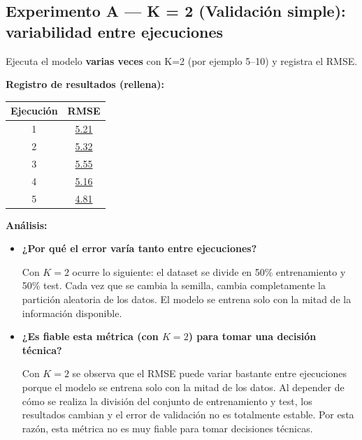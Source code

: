 \documentclass[12pt,oneside]{book}
\begin{document}
\subsection{Experimento A — K = 2 (Validación simple): variabilidad entre ejecuciones}

\noindent Ejecuta el modelo \textbf{varias veces} con K=2 (por ejemplo 5--10) y registra el RMSE.

\begin{center}
\end{center}

\noindent\textbf{Registro de resultados (rellena):}
\begin{center}
\begin{tabular}{|c|c|}
\hline
Ejecución & RMSE \\
\hline
1 & \underline{5.21} \\
2 & \underline{5.32} \\
3 & \underline{5.55} \\
4 & \underline{5.16} \\
5 & \underline{4.81} \\
\hline
\end{tabular}
\end{center}

\vspace{0.2cm}
\noindent\textbf{Análisis:}
\begin{itemize}
    \item \textbf{¿Por qué el error varía tanto entre ejecuciones?}
    
    Con $K = 2$ ocurre lo siguiente: el dataset se divide en 50\% entrenamiento y 50\% test. Cada vez que se cambia la semilla, cambia completamente la partición aleatoria de los datos. El modelo se entrena solo con la mitad de la información disponible.

    \item \textbf{¿Es fiable esta métrica (con $K=2$) para tomar una decisión técnica?}
    
    Con $K=2$ se observa que el RMSE puede variar bastante entre ejecuciones porque el modelo se entrena solo con la mitad de los datos. Al depender de cómo se realiza la división del conjunto de entrenamiento y test, los resultados cambian y el error de validación no es totalmente estable. Por esta razón, esta métrica no es muy fiable para tomar decisiones técnicas.
\end{itemize}

\newpage
\end{document}
